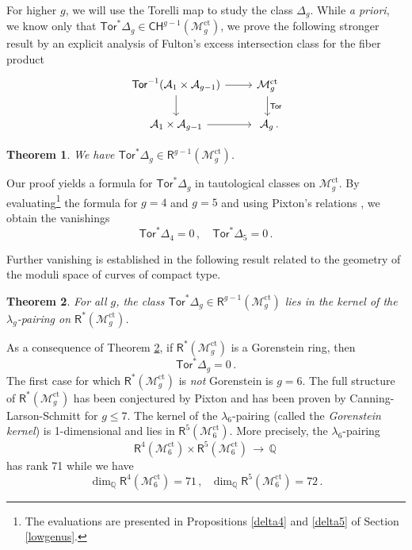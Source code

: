 \documentclass[11pt]{amsart}
\newtheorem{thm}{Theorem}
\theoremstyle{definition}
\newcommand{\qq}{\mathbb{Q}}
\newcommand{\R}{\mathsf{R}}
\newcommand{\M}{\mathcal{M}}
\newcommand{\A}{\mathcal{A}}
\DeclareMathOperator{\ct}{ct}
\newcommand{\Tor}{\mathsf{Tor}}
\begin{document}
For higher $g$, we will use the Torelli map to study the class $\Delta_g$.
While {\em a priori}, we know only that $\Tor^*\Delta_g\in \mathsf{CH}^{g-1}(\M_g^{\ct})$, we prove the following
stronger result by an explicit analysis of Fulton's
excess intersection class \cite{Fulton}
for the fiber product 
\[
\begin{tikzcd}
\Tor^{-1}(\A_1\times \A_{g-1}) \arrow[d] \arrow[r] & \M_g^{\ct} \arrow[d, "\Tor"] \\
\A_1\times \A_{g-1} \arrow[r]       & \ \A_g \, .                       
\end{tikzcd}
\]



\begin{thm} \label{tortaut} We have $\Tor^*\Delta_g\in \R^{g-1}(\M_g^{\ct})$.\end{thm} 

Our proof yields a formula for $\Tor^*\Delta_g$ 
in tautological classes on
$\mathcal{M}_g^{\ct}$.
By evaluating{\footnote{The evaluations are presented in
Propositions \ref{delta4} and \ref{delta5} of Section \ref{lowgenus}.}} the
formula for $g=4$ and $g=5$ and using
Pixton's relations \cite{Janda, PPZ, Pix},
we obtain the vanishings \begin{equation}\label{tordelta45}\Tor^*\Delta_4=0\, , \quad \Tor^*\Delta_5=0\, .\end{equation}

Further vanishing is established
in the following result related to the geometry of 
the moduli space of curves of compact type. 


\begin{thm}\label{vang}
    For all $g$,
    the class $\Tor^*\Delta_g\in \mathsf{R}^{g-1}(\M^{\ct}_g)$ 
    lies in the kernel 
    of the $\lambda_g$-pairing
    on $\mathsf{R}^*(\mathcal{M}_g^{\ct})$.  
    \end{thm}

As a consequence of Theorem \ref{vang}, if
$\mathsf{R}^*(\mathcal{M}_g^{\ct})$
is a Gorenstein ring, then
$$\Tor^*\Delta_g=0\, .$$
The first case for which
$\mathsf{R}^*(\mathcal{M}_g^{\ct})$
is {\em not} Gorenstein is
$g=6$. The full structure
of $\mathsf{R}^*(\mathcal{M}_g^{\ct})$
has been conjectured 
by Pixton \cite{Pix} and has been proven by Canning-Larson-Schmitt \cite{CLS} for $g\leq 7$.
The kernel of the $\lambda_6$-pairing 
(called the {\em Gorenstein kernel}) is 1-dimensional
and lies in $\mathsf{R}^5(\mathcal{M}_6^{\ct})$. More precisely,
the $\lambda_6$-pairing
$$\R^4(\M_6^{\ct})\times \R^{5}(\M_6^{\ct})\,\to\,  \mathbb Q\, $$
has rank 71 while we have
$$\dim_\qq \R^4(\M_6^{\ct}) = 71\, , \ \ \
\dim_\qq \R^5(\M_6^{\ct}) = 72\, .$$
\end{document}
